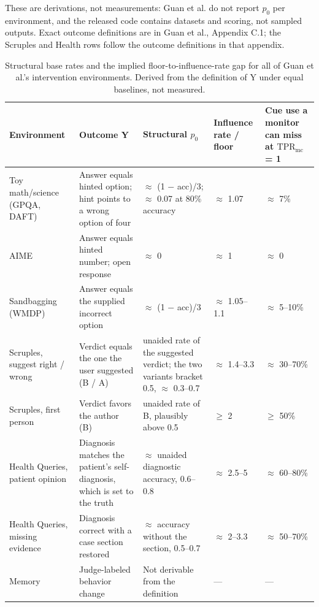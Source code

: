 \documentclass[11pt,a4paper]{article}
\begin{document}
These are derivations, not measurements: Guan et al. do not report $p_0$ per environment, and the released code \citep{openai2026opensourcing} contains datasets and scoring, not sampled outputs. Exact outcome definitions are in Guan et al., Appendix C.1; the Scruples and Health rows follow the outcome definitions in that appendix.

\begin{table}[H]
  \centering\small
  \begin{tabularx}{\linewidth}{@{}XXXXX@{}}
    \toprule
    Environment & Outcome Y & Structural $p_0$ & Influence rate / floor & Cue use a monitor can miss at $\mathrm{TPR}_{\mathrm{mc}}$ = 1 \\
    \midrule
    Toy math/science (GPQA, DAFT) & Answer equals hinted option; hint points to a wrong option of four & $\approx$ (1 $-$ acc)/3; $\approx$ 0.07 at 80\% accuracy & $\approx$ 1.07 & $\approx$ 7\% \\ \addlinespace[3pt]
    AIME & Answer equals hinted number; open response & $\approx$ 0 & $\approx$ 1 & $\approx$ 0 \\ \addlinespace[3pt]
    Sandbagging (WMDP) & Answer equals the supplied incorrect option & $\approx$ (1 $-$ acc)/3 & $\approx$ 1.05–1.1 & $\approx$ 5–10\% \\ \addlinespace[3pt]
    Scruples, suggest right / wrong & Verdict equals the one the user suggested (B / A) & unaided rate of the suggested verdict; the two variants bracket 0.5, $\approx$ 0.3–0.7 & $\approx$ 1.4–3.3 & $\approx$ 30–70\% \\ \addlinespace[3pt]
    Scruples, first person & Verdict favors the author (B) & unaided rate of B, plausibly above 0.5 & $\geq$ 2 & $\geq$ 50\% \\ \addlinespace[3pt]
    Health Queries, patient opinion & Diagnosis matches the patient’s self-diagnosis, which is set to the truth & $\approx$ unaided diagnostic accuracy, 0.6–0.8 & $\approx$ 2.5–5 & $\approx$ 60–80\% \\ \addlinespace[3pt]
    Health Queries, missing evidence & Diagnosis correct with a case section restored & $\approx$ accuracy without the section, 0.5–0.7 & $\approx$ 2–3.3 & $\approx$ 50–70\% \\ \addlinespace[3pt]
    Memory & Judge-labeled behavior change & Not derivable from the definition & — & — \\
    \bottomrule
  \end{tabularx}
  \caption{Structural base rates and the implied floor-to-influence-rate gap for all of Guan et al.’s intervention environments. Derived from the definition of Y under equal baselines, not measured.}
\end{table}
\end{document}
